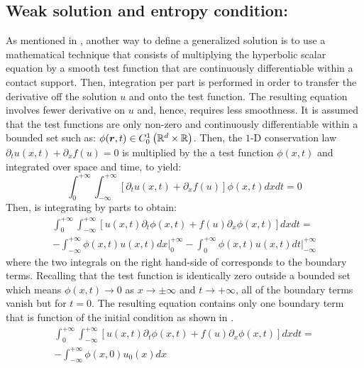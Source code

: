 \subsection{Weak solution and entropy condition:}\label{weak_sct1b}
As mentioned in , another way to define a generalized solution is to use a mathematical technique that consists of multiplying the hyperbolic scalar equation by a smooth test function that are continuously differentiable within a contact support. Then, integration per part is performed in order to transfer the derivative off the solution $u$ and onto the test function. The resulting equation involves fewer derivative on $u$ and, hence, requires less smoothness. It is assumed that the test functions are only non-zero and continuously differentiable within a bounded set such as: $\phi(\boldsymbol r,t) \in C_0^1 \left( \mathbb{R}^d \times \mathbb{R} \right)$. 
Then, the $1$-D conservation law $\partial_t u(x,t) + \partial_x f(u) = 0$ is multiplied by the a test function $\phi(x,t)$ and integrated over space and time, to yield:
%
\begin{equation}\label{eq:weak_sol_sct1b}
\int_0^{+\infty}\int_{-\infty}^{+\infty} \left[ \partial_t u(x,t) + \partial_x f(u) \right] \phi(x,t) dx dt = 0
\end{equation}
% 
Then,  is integrating by parts to obtain:
%
\begin{eqnarray}\label{eq:weak_sol2_sct1b}
\int_0^{+\infty}\int_{-\infty}^{+\infty} \left[ u(x,t) \partial_t \phi(x,t)   + f(u) \partial_x \phi(x,t)  \right] dx dt = \nonumber \\
-\int_{-\infty}^{+\infty} \phi(x,t) u(x,t) dx \left. \right|_0^{+\infty} - \int_0^{+\infty} \phi(x,t) u(x,t) dt \left. \right|_{-\infty}^{+\infty}
\end{eqnarray}
%
where the two integrals on the right hand-side of  corresponds to the boundary terms. Recalling that the test function is identically zero outside a bounded set which means $\phi(x,t) \to 0$ as $x \to \pm  \infty$ and $t \to +\infty$, all of the boundary terms vanish but for $t=0$. The resulting equation contains only one boundary term that is function of the initial condition as shown in .
%
\begin{eqnarray}\label{eq:weak_sol3_sct1b}
\int_0^{+\infty}\int_{-\infty}^{+\infty} \left[ u(x,t) \partial_t \phi(x,t)   + f(u) \partial_x \phi(x,t)  \right] dx dt = \nonumber \\
-\int_{-\infty}^{+\infty} \phi(x,0) u_0(x) dx 
\end{eqnarray}
